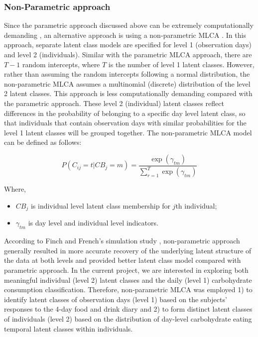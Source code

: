 \vspace{-0.5cm}
\subsubsection{Non-Parametric approach}\vspace{-0.3cm}


Since the parametric approach discussed above can be extremely computationally demanding \parencite{van2008using, vermunt2008latent}, an alternative approach is using a non-parametric MLCA \parencite{davidian2008growth}. In this approach, separate latent class models are specified for level 1 (observation days) and level 2 (individuals). Similar with the parametric MLCA approach, there are $T-1$ random intercepts, where $T$ is the number of level 1 latent classes. However, rather than assuming the random intercepts following a normal distribution, the non-parametric MLCA assumes a multinomial (discrete) distribution of the level 2 latent classes. This approach is less computationally demanding compared with the parametric approach. These level 2 (individual) latent classes reflect differences in the probability of belonging to a specific day level latent class, so that individuals that contain observation days with similar probabilities for the level 1 latent classes will be grouped together. The non-parametric MLCA model can be defined as follows: \vspace{-0.7cm}

\begin{equation}
P(C_{ij} = t | CB_j = m)  = \frac{\exp(\gamma_{tm})}{\sum_{r=1}^{T}\exp(\gamma_{tm})}
\end{equation}

Where, 

\begin{itemize}
	\item $CB_j$ is individual level latent class membership for $j$th individual;
	\item $\gamma_{tm}$ is day level and individual level indicators. 
\end{itemize}

According to Finch and French's simulation study \parencite{finch2014multilevel}, non-parametric approach generally resulted in more accurate recovery of the underlying latent structure of the data at both levels and provided better latent class model compared with parametric approach. In the current project, we are interested in exploring both meaningful individual (level 2) latent classes and the daily (level 1) carbohydrate consumption classification. Therefore, non-parametric MLCA was employed 1) to identify latent classes of observation days (level 1) based on the subjects' responses to the 4-day food and drink diary and 2) to form distinct latent classes of individuals (level 2) based on the distribution of day-level carbohydrate eating temporal latent classes within individuals.\vspace{-0.3cm}
 

